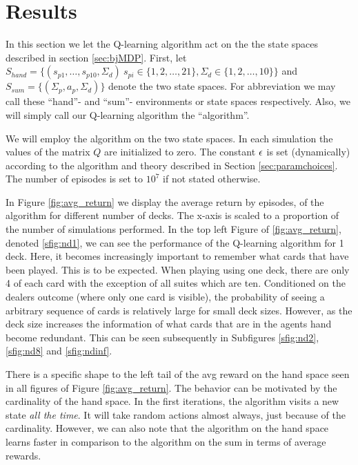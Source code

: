 \section{Results}\label{sec:results}
In this section we let the Q-learning algorithm act on the the state spaces described in section \ref{sec:bjMDP}. First, let $S_{hand}=\{  (s_{p1},\ldots,s_{p10},\Sigma_{d})\ s_{pi} \in \{1,2,\ldots, 21 \}, \Sigma_{d}\in \{1,2,\ldots, 10 \} \}$ and $S_{sum}=\{  (\Sigma_p, a_p, \Sigma_d )  \}$ denote the two state spaces. For abbreviation we may call these ``hand''- and ``sum''- environments or state spaces respectively. Also, we will simply call our Q-learning algorithm the ``algorithm''.

We will employ the algorithm on the two state spaces. In each simulation the values of the matrix $Q$ are initialized to zero. The constant $\epsilon$ is set (dynamically) according to the algorithm and theory described in Section \ref{sec:paramchoices}. The number of episodes is set to $10^7$ if not stated otherwise. 

In Figure \ref{fig:avg_return} we display the average return by episodes, of the algorithm for different number of decks. The x-axis is scaled to a proportion of the number of simulations performed. In the top left Figure of \ref{fig:avg_return}, denoted \ref{sfig:nd1}, we can see the performance of the Q-learning algorithm for 1 deck. Here, it becomes increasingly important to remember what cards that have been played. This is to be expected. When playing using one deck, there are only 4 of each card with the exception of all suites which are ten. Conditioned on the dealers outcome (where only one card is visible), the probability of seeing a arbitrary sequence of cards is relatively large for small deck sizes. However, as the deck size increases the information of what cards that are in the agents hand become redundant. This can be seen subsequently in Subfigures \ref{sfig:nd2}, \ref{sfig:nd8} and \ref{sfig:ndinf}. 

There is a specific shape to the left tail of the avg reward on the hand space seen in all figures of Figure \ref{fig:avg_return}. The behavior can be motivated by the cardinality of the hand space. In the first iterations, the algorithm visits a new state \textit{all the time}. It will take random actions almost always, just because of the cardinality. However, we can also note that the algorithm on the hand space learns faster in comparison to the algorithm on the sum in terms of average rewards. 
   
